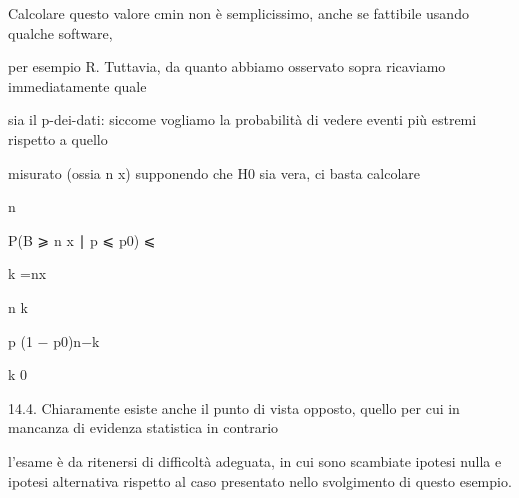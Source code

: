 \documentclass[a4paper,portrait,12pt]{article}
\begin{document}
\begin{flushleft}
Calcolare questo valore cmin non \`{e} semplicissimo, anche se fattibile usando qualche software,
\end{flushleft}


\begin{flushleft}
per esempio R. Tuttavia, da quanto abbiamo osservato sopra ricaviamo immediatamente quale
\end{flushleft}


\begin{flushleft}
sia il p-dei-dati: siccome vogliamo la probabilit\`{a} di vedere eventi più estremi rispetto a quello
\end{flushleft}


\begin{flushleft}
misurato (ossia n x) supponendo che H0 sia vera, ci basta calcolare
\end{flushleft}


\begin{flushleft}
n
\end{flushleft}





\begin{flushleft}
P(B ⩾ n x ∣ p ⩽ p0) ⩽
\end{flushleft}


\begin{flushleft}
k =nx
\end{flushleft}





\begin{flushleft}
n k
\end{flushleft}


\begin{flushleft}
p (1 $-$ p0)n$-$k
\end{flushleft}


\begin{flushleft}
k 0
\end{flushleft}





\begin{flushleft}
14.4. Chiaramente esiste anche il punto di vista opposto, quello per cui in mancanza di evidenza statistica in contrario
\end{flushleft}


\begin{flushleft}
l'esame \`{e} da ritenersi di difficolt\`{a} adeguata, in cui sono scambiate ipotesi nulla e ipotesi alternativa rispetto al caso presentato nello svolgimento di questo esempio.
\end{flushleft}
\end{document}
